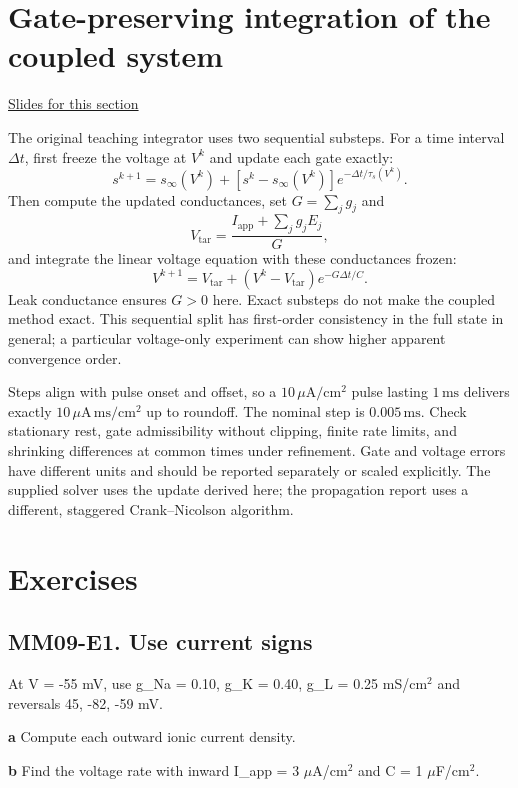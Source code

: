 \documentclass[11pt,letterpaper]{article}
\theoremstyle{definition}\newtheorem{definition}{Definition}\newtheorem{example}{Example}
\numberwithin{equation}{section}
\begin{document}
\section{Gate-preserving integration of the coupled system}
\hypertarget{note-gate-preserving-integration-of-the-coupled-system}{}\label{note:gate-preserving-integration-of-the-coupled-system}
{\small \href{slides.html\#frame=an-exact-gate-substep\&step=1}{Slides for this section}}\par
The original teaching integrator uses two sequential substeps. For a time interval $\Delta t$, first freeze the voltage at $V^k$ and update each gate exactly:
\[
s^{k+1}=s_\infty(V^k)+[s^k-s_\infty(V^k)]e^{-\Delta t/\tau_s(V^k)}.
\]
Then compute the updated conductances, set $G=\sum_jg_j$ and
\[
V_{\mathrm{tar}}=\frac{I_{\mathrm{app}}+\sum_jg_jE_j}{G},
\]
and integrate the linear voltage equation with these conductances frozen:
\[
V^{k+1}=V_{\mathrm{tar}}+(V^k-V_{\mathrm{tar}})e^{-G\Delta t/C}.
\]
Leak conductance ensures $G>0$ here. Exact substeps do not make the coupled method exact. This sequential split has first-order consistency in the full state in general; a particular voltage-only experiment can show higher apparent convergence order.

Steps align with pulse onset and offset, so a $10\,\mu\mathrm A/\mathrm{cm}^2$ pulse lasting $1\,\mathrm{ms}$ delivers exactly $10\,\mu\mathrm A\,\mathrm{ms}/\mathrm{cm}^2$ up to roundoff. The nominal step is $0.005\,\mathrm{ms}$. Check stationary rest, gate admissibility without clipping, finite rate limits, and shrinking differences at common times under refinement. Gate and voltage errors have different units and should be reported separately or scaled explicitly. The supplied solver uses the update derived here; the propagation report uses a different, staggered Crank--Nicolson algorithm.
\bigskip
\section*{Exercises}
\par\noindent\begin{minipage}{\linewidth}
\subsection*{MM09-E1. Use current signs}
At V =\allowbreak{} -55 mV, use g\_Na =\allowbreak{} 0.10, g\_K =\allowbreak{} 0.40, g\_L =\allowbreak{} 0.25 mS/cm$^2$ and reversals 45, -82, -59 mV.

\textbf{a} Compute each outward ionic current density.

\end{minipage}\par\medskip
\textbf{b} Find the voltage rate with inward I\_app =\allowbreak{} 3 $\mu$A/cm$^2$ and C =\allowbreak{} 1 $\mu$F/cm$^2$.
\end{document}
